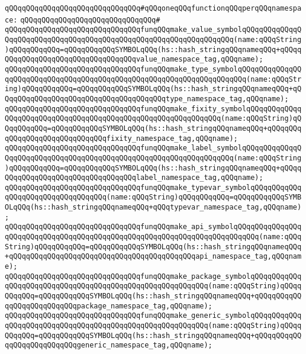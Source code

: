 \verb|qQQqqQQqqQQqqQQqqQQqqQQqqQQqqQQq#qQQqoneqQQqfunctionqQQqperqQQqnamespace:|\newline
\verb|qQQqqQQqqQQqqQQqqQQqqQQqqQQqqQQq#|\newline
\verb|qQQqqQQqqQQqqQQqqQQqqQQqqQQqqQQqfunqQQqmake_value_symbolqQQqqQQqqQQqqQQqqQQqqQQqqQQqqQQqqQQqqQQqqQQqqQQqqQQqqQQqqQQqqQQqqQQq(name:qQQqString)qQQqqQQqqQQq=qQQqqQQqqQQqSYMBOLqQQq(hs::hash_stringqQQqnameqQQq+qQQqqQQqqQQqqQQqqQQqqQQqqQQqqQQqqQQqvalue_namespace_tag,qQQqname);|\newline
\verb|qQQqqQQqqQQqqQQqqQQqqQQqqQQqqQQqfunqQQqmake_type_symbolqQQqqQQqqQQqqQQqqQQqqQQqqQQqqQQqqQQqqQQqqQQqqQQqqQQqqQQqqQQqqQQqqQQqqQQq(name:qQQqString)qQQqqQQqqQQq=qQQqqQQqqQQqSYMBOLqQQq(hs::hash_stringqQQqnameqQQq+qQQqqQQqqQQqqQQqqQQqqQQqqQQqqQQqqQQqqQQqtype_namespace_tag,qQQqname);|\newline
\verb|qQQqqQQqqQQqqQQqqQQqqQQqqQQqqQQqfunqQQqmake_fixity_symbolqQQqqQQqqQQqqQQqqQQqqQQqqQQqqQQqqQQqqQQqqQQqqQQqqQQqqQQqqQQqqQQq(name:qQQqString)qQQqqQQqqQQq=qQQqqQQqqQQqSYMBOLqQQq(hs::hash_stringqQQqnameqQQq+qQQqqQQqqQQqqQQqqQQqqQQqqQQqqQQqfixity_namespace_tag,qQQqname);|\newline
\verb|qQQqqQQqqQQqqQQqqQQqqQQqqQQqqQQqfunqQQqmake_label_symbolqQQqqQQqqQQqqQQqqQQqqQQqqQQqqQQqqQQqqQQqqQQqqQQqqQQqqQQqqQQqqQQqqQQq(name:qQQqString)qQQqqQQqqQQq=qQQqqQQqqQQqSYMBOLqQQq(hs::hash_stringqQQqnameqQQq+qQQqqQQqqQQqqQQqqQQqqQQqqQQqqQQqqQQqlabel_namespace_tag,qQQqname);|\newline
\verb|qQQqqQQqqQQqqQQqqQQqqQQqqQQqqQQqfunqQQqmake_typevar_symbolqQQqqQQqqQQqqQQqqQQqqQQqqQQqqQQqqQQq(name:qQQqString)qQQqqQQqqQQq=qQQqqQQqqQQqSYMBOLqQQq(hs::hash_stringqQQqnameqQQq+qQQqtypevar_namespace_tag,qQQqname);|\newline
\verb|qQQqqQQqqQQqqQQqqQQqqQQqqQQqqQQqfunqQQqmake_api_symbolqQQqqQQqqQQqqQQqqQQqqQQqqQQqqQQqqQQqqQQqqQQqqQQqqQQqqQQqqQQqqQQqqQQqqQQqqQQq(name:qQQqString)qQQqqQQqqQQq=qQQqqQQqqQQqSYMBOLqQQq(hs::hash_stringqQQqnameqQQq+qQQqqQQqqQQqqQQqqQQqqQQqqQQqqQQqqQQqqQQqqQQqapi_namespace_tag,qQQqname);|\newline
\verb|qQQqqQQqqQQqqQQqqQQqqQQqqQQqqQQqfunqQQqmake_package_symbolqQQqqQQqqQQqqQQqqQQqqQQqqQQqqQQqqQQqqQQqqQQqqQQqqQQqqQQqqQQq(name:qQQqString)qQQqqQQqqQQq=qQQqqQQqqQQqSYMBOLqQQq(hs::hash_stringqQQqnameqQQq+qQQqqQQqqQQqqQQqqQQqqQQqqQQqpackage_namespace_tag,qQQqname);|\newline
\verb|qQQqqQQqqQQqqQQqqQQqqQQqqQQqqQQqfunqQQqmake_generic_symbolqQQqqQQqqQQqqQQqqQQqqQQqqQQqqQQqqQQqqQQqqQQqqQQqqQQqqQQqqQQq(name:qQQqString)qQQqqQQqqQQq=qQQqqQQqqQQqSYMBOLqQQq(hs::hash_stringqQQqnameqQQq+qQQqqQQqqQQqqQQqqQQqqQQqqQQqgeneric_namespace_tag,qQQqname);|\newline
